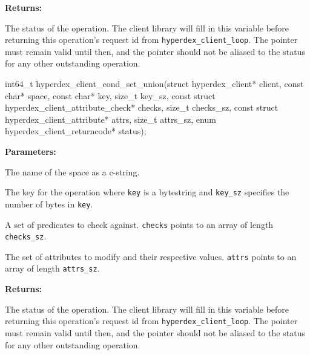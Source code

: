 \noindent\textbf{Returns:}
\begin{description}[labelindent=\widthof{{\texttt{status}}},leftmargin=*,noitemsep,nolistsep,align=right]
\item[\texttt{status}] The status of the operation.  The client library will fill in this variable before returning this operation's request id from \texttt{hyperdex\_client\_loop}.  The pointer must remain valid until then, and the pointer should not be aliased to the status for any other outstanding operation.
\end{description}

\funcsep
{}
\begin{ccode}
int64_t hyperdex_client_cond_set_union(struct hyperdex_client* client,
                const char* space,
                const char* key, size_t key_sz,
                const struct hyperdex_client_attribute_check* checks, size_t checks_sz,
                const struct hyperdex_client_attribute* attrs, size_t attrs_sz,
                enum hyperdex_client_returncode* status);
\end{ccode}
\funcdesc 

\noindent\textbf{Parameters:}
\begin{description}[labelindent=\widthof{{\texttt{checks}, \texttt{checks\_sz}}},leftmargin=*,noitemsep,nolistsep,align=right]
\item[\texttt{space}] The name of the space as a c-string.
\item[\texttt{key}, \texttt{key\_sz}] The key for the operation where \texttt{key} is a bytestring and \texttt{key\_sz} specifies the number of bytes in \texttt{key}.
\item[\texttt{checks}, \texttt{checks\_sz}] A set of predicates to check against.  \texttt{checks} points to an array of length \texttt{checks\_sz}.
\item[\texttt{attrs}, \texttt{attrs\_sz}] The set of attributes to modify and their respective values.  \texttt{attrs} points to an array of length \texttt{attrs\_sz}.
\end{description}

\noindent\textbf{Returns:}
\begin{description}[labelindent=\widthof{{\texttt{status}}},leftmargin=*,noitemsep,nolistsep,align=right]
\item[\texttt{status}] The status of the operation.  The client library will fill in this variable before returning this operation's request id from \texttt{hyperdex\_client\_loop}.  The pointer must remain valid until then, and the pointer should not be aliased to the status for any other outstanding operation.
\end{description}

